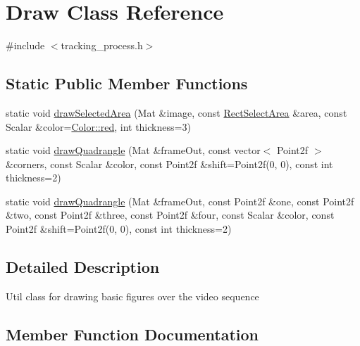 \hypertarget{class_draw}{}\section{Draw Class Reference}
\label{class_draw}


{\ttfamily \#include $<$tracking\+\_\+process.\+h$>$}

\subsection*{Static Public Member Functions}
\begin{DoxyCompactItemize}
\item 
static void \hyperlink{class_draw_a54a8d0e7bb55b04a043a4826cce7597c}{draw\+Selected\+Area} (Mat \&image, const \hyperlink{class_rect_select_area}{Rect\+Select\+Area} \&area, const Scalar \&color=\hyperlink{struct_color_a3a719c8fa99595a064873ff3735b191e}{Color\+::red}, int thickness=3)
\item 
static void \hyperlink{class_draw_ae913dc8558c01a647d0ea13508a64d36}{draw\+Quadrangle} (Mat \&frame\+Out, const vector$<$ Point2f $>$ \&corners, const Scalar \&color, const Point2f \&shift=Point2f(0, 0), const int thickness=2)
\item 
static void \hyperlink{class_draw_ad625910a7a637a54503985c91b893680}{draw\+Quadrangle} (Mat \&frame\+Out, const Point2f \&one, const Point2f \&two, const Point2f \&three, const Point2f \&four, const Scalar \&color, const Point2f \&shift=Point2f(0, 0), const int thickness=2)
\end{DoxyCompactItemize}


\subsection{Detailed Description}
Util class for drawing basic figures over the video sequence 

\subsection{Member Function Documentation}
